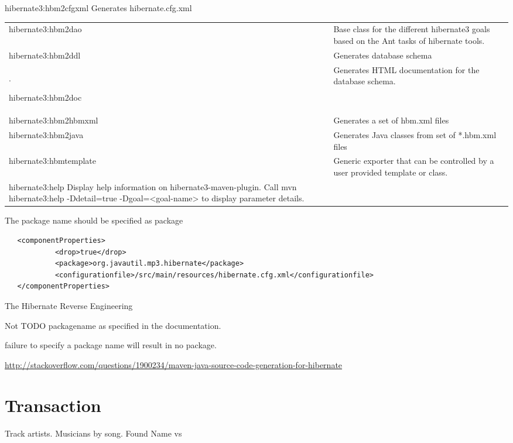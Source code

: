 \documentclass[a4paper,10pt]{book}
\begin{document}
hibernate3:hbm2cfgxml
  Generates hibernate.cfg.xml
\begin{tabular}{ l | l}
 
hibernate3:hbm2dao &
  Base class for the different hibernate3 goals based on the Ant tasks of
  hibernate tools. \\ \newline

hibernate3:hbm2ddl &
  Generates database schema \\.

hibernate3:hbm2doc &
  Generates HTML documentation for the database schema. \\

hibernate3:hbm2hbmxml &
  Generates a set of hbm.xml files \\

hibernate3:hbm2java &
  Generates Java classes from set of *.hbm.xml files  \\

hibernate3:hbmtemplate &  Generic exporter that can be controlled by a user provided template or class. \\

hibernate3:help
  Display help information on hibernate3-maven-plugin. Call
    mvn hibernate3:help -Ddetail=true -Dgoal=<goal-name>
  to display parameter details.

\end{tabular}

The package name should be specified as package
\begin{program}
 \begin{verbatim}
   <componentProperties>
            <drop>true</drop>
            <package>org.javautil.mp3.hibernate</package>
            <configurationfile>/src/main/resources/hibernate.cfg.xml</configurationfile>
   </componentProperties>
 \end{verbatim}
  \caption{The Hibernate Reverse Engineering}
\end{program}

 

Not TODO packagename as specified in the documentation.

failure to specify a package name will result in no package.

\url{http://stackoverflow.com/questions/1900234/maven-java-source-code-generation-for-hibernate}

\section{Transaction}
Track artists.
Musicians by song.
Found Name vs
\end{document}

